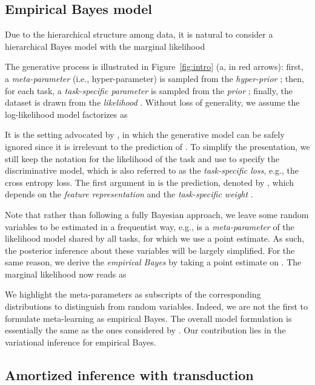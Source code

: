 \documentclass{article} \usepackage{iclr2020_conference,times}
\begin{document}
\subsection{Empirical Bayes model}

Due to the hierarchical structure among data, it is natural to 
consider a hierarchical Bayes model with the marginal likelihood

The generative process is illustrated in Figure~\ref{fig:intro} (a, in red arrows):
first, a \emph{meta-parameter}  (i.e., hyper-parameter) is sampled from the \emph{hyper-prior} ;
then, for each task, a \emph{task-specific parameter}  is sampled from the \emph{prior} ;
finally, the dataset is drawn from the \emph{likelihood} . Without loss of generality, we assume the log-likelihood model factorizes as 

It is the setting advocated by \citet{minka2005discriminative}, 
in which the generative model  can be safely ignored since 
it is irrelevant to the prediction of .
To simplify the presentation, 
we still keep the notation  for the likelihood of the task  and 
use  to specify the discriminative model, which is also referred to as
the \emph{task-specific loss}, e.g., the cross entropy loss. The first argument in  is the prediction, denoted by , 
which depends on the \emph{feature representation}  and the \emph{task-specific weight} . 

Note that rather than following a fully Bayesian approach, 
we leave some random variables to be estimated in a frequentist way, 
e.g.,  is a \emph{meta-parameter} of the likelihood model shared by all tasks, 
for which we use a point estimate.
As such, the posterior inference about these variables will be largely simplified.
For the same reason, we derive the \emph{empirical Bayes} \mbox{\citep{robbins1985empirical,kucukelbir2014population}}
by taking a point estimate on . The marginal likelihood now reads as

We highlight the meta-parameters as subscripts of the corresponding distributions to distinguish from random variables.
Indeed, we are not the first to formulate meta-learning as empirical Bayes.
The overall model formulation is essentially the same as the ones considered by 
\citet{amit2018meta,grant2018recasting,ravi2018amortized}. 
Our contribution lies in the variational inference for empirical Bayes.

\subsection{Amortized inference with transduction}
\label{sec:avi}
\end{document}
